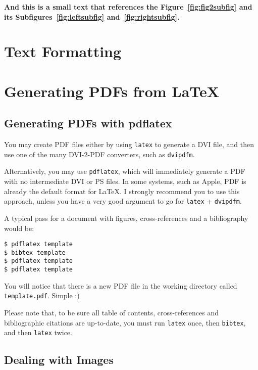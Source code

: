 \textbf{And this is a small text that references the Figure~\ref{fig:fig2subfig} and its Subfigures~\ref{fig:leftsubfig} and~\ref{fig:rightsubfig}.}

\lipsum[1-3]


\section{Text Formatting} %
\label{sec:text_formatting}



\section{Generating PDFs from \LaTeX} %
\label{sec:generating_pdfs_from_latex}

\subsection{Generating PDFs with pdflatex} %
\label{ssec:generating_pdfs_with_pdflatex}

You may create PDF files either by using \verb!latex! to generate a DVI file, and then use one of the many DVI-2-PDF converters, such as \verb!dvipdfm!.

Alternatively, you may use \verb!pdflatex!, which will immediately generate a PDF with no intermediate DVI or PS files. In some systems, such as Apple, PDF is already the default format for \LaTeX. I strongly recommend you to use this approach, unless you have a very good argument to go for \verb!latex! + \verb!dvipdfm!.

A typical pass for a document with figures, cross-references and a bibliography would be:
\begin{verbatim}
$ pdflatex template
$ bibtex template
$ pdflatex template
$ pdflatex template
\end{verbatim}
You will notice that there is a new PDF file in the working directory called \verb!template.pdf!. Simple :)

Please note that, to be sure all table of contents, cross-references and bibliographic citations are up-to-date, you must run \verb!latex! once, then \verb!bibtex!, and then \verb!latex! twice.

\subsection{Dealing with Images} %
\label{sub:dealing_with_images}

